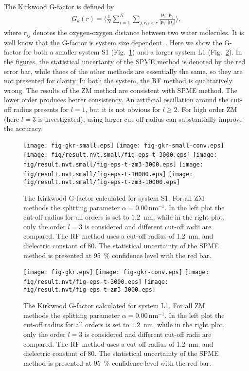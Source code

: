 \documentclass[a4paper,reprint,unsortedaddress,onecolumn]{revtex4-1}
\begin{document}
The Kirkwood G-factor is defined by~\cite{vanderSpoel2006origin}
\begin{align}
  G_k(r) =
  \Big\langle
  \frac 1N
  \sum_{i=1}^N \sum_{j, r_{ij} < r}
  \frac {\boldsymbol\mu_i \cdot \boldsymbol\mu_j}{\vert \boldsymbol\mu_i\vert \cdot \vert\boldsymbol\mu_j\vert}
  \Big\rangle,
\end{align}
where $r_{ij}$ denotes the oxygen-oxygen distance between two water
molecules.  It is well know that the G-factor is system size
dependent~\cite{vanderSpoel2006origin}. Here we show the G-factor for
both a smaller system S1 (Fig.~\ref{fig:tmp1}) and a larger system L1
(Fig.~\ref{fig:tmp2}).  In the figures, the statistical uncertanty of
the SPME method is denoted by the red error bar, while thoes of the
other methods are essentially the same, so they are not presented for
clarity.  In both the system, the RF method is qualitatively
wrong. The results of the ZM method are consistent with SPME
method. The lower order produces better consistency.  An artificial
oscillation around the cut-off radius presents for $l=1$, but it is
not obvious for $l\geq 2$.  For high order ZM (here $l=3$ is investigated),
using larger cut-off radius can substantially improve the accuracy.

\begin{figure}
  \centering
  \texttt{[image: fig-gkr-small.eps]}
  \texttt{[image: fig-gkr-small-conv.eps]}
  \texttt{[image: fig/result.nvt.small/fig-eps-t-3000.eps]}
  \texttt{[image: fig/result.nvt.small/fig-eps-t-zm3-3000.eps]}
  \texttt{[image: fig/result.nvt.small/fig-eps-t-10000.eps]}
  \texttt{[image: fig/result.nvt.small/fig-eps-t-zm3-10000.eps]}
  \caption{The Kirkwood G-factor calculated for system S1.
    For all ZM methods the splitting parameter $\alpha = 0.00\,\textrm{nm}^{-1}$.
    In the left plot the cut-off radius for all orders is set to $1.2$~nm, while
    in the right plot, only the order $l=3$ is considered and different cut-off radii are compared.
    The RF method uses a cut-off radius of 1.2~nm, and dielectric constant of 80.
    The statistical uncertainty of the SPME method is presented at 95~\% confidence level with the red bar.
  }
  \label{fig:tmp1}
\end{figure}

\begin{figure}
  \centering
  \texttt{[image: fig-gkr.eps]}
  \texttt{[image: fig-gkr-conv.eps]}
  \texttt{[image: fig/result.nvt/fig-eps-t-3000.eps]}
  \texttt{[image: fig/result.nvt/fig-eps-t-zm3-3000.eps]}
  \caption{The Kirkwood G-factor calculated for system L1.
    For all ZM methods the splitting parameter $\alpha = 0.00\,\textrm{nm}^{-1}$.
    In the left plot the cut-off radius for all orders is set to $1.2$~nm, while
    in the right plot, only the order $l=3$ is considered and different cut-off radii are compared.
    The RF method uses a cut-off radius of 1.2~nm, and dielectric constant of 80.
    The statistical uncertainty of the SPME method is presented at 95~\% confidence level with the red bar.
  }
  \label{fig:tmp2}
\end{figure}
\end{document}
